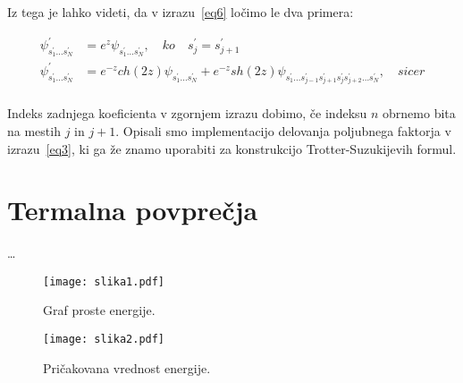 \documentclass[a4paper]{article}
\begin{document}
    Iz tega je lahko videti, da v izrazu~\ref{eq6} ločimo le dva primera:

    \begin{equation}\label{eq9}
    \begin{split}
        \psi_{s_1^\prime \ldots s_N^\prime}^\prime &= e^{z} \psi_{s_1^\prime \ldots s_N^\prime},
        \quad ko \quad s_j^\prime = s_{j+1}^\prime\\
        \psi_{s_1^\prime \ldots s_N^\prime}^\prime &= e^{-z}ch(2z) \psi_{s_1^\prime \ldots s_N^\prime} + e^{-z}sh(2z)
        \psi_{s_1^\prime \ldots s_{j-1}^\prime s_{j+1}^\prime s_j^\prime s_{j+2}^\prime \ldots s_N^\prime},
        \quad sicer\\
    \end{split}
    \end{equation}

    Indeks zadnjega koeficienta v zgornjem izrazu dobimo, če indeksu $n$ obrnemo bita na mestih $j$ in $j+1$.
    Opisali smo implementacijo delovanja poljubnega faktorja v izrazu~\ref{eq3}, ki ga že znamo uporabiti za
    konstrukcijo Trotter-Suzukijevih formul.

    \section{Termalna povprečja}

    \ldots

    \begin{figure}
        \centering
        \texttt{[image: slika1.pdf]}
        \caption{Graf proste energije.}
        \label{slika1}
    \end{figure}

    \begin{figure}
        \centering
        \texttt{[image: slika2.pdf]}
        \caption{Pričakovana vrednost energije.}
        \label{slika2}
    \end{figure}
\end{document}
